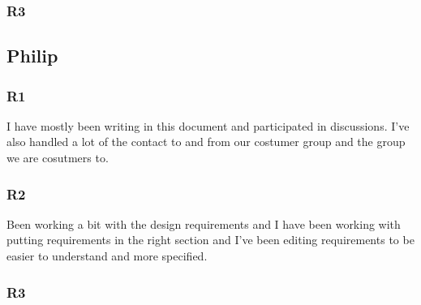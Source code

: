 \documentclass[a4paper]{article}
\begin{document}
    \subsubsection{R3}
  \subsection{Philip}
    \subsubsection{R1}
  I have mostly been writing in this document and participated in discussions. I've also handled a lot of the contact to and from our costumer group and the group we are cosutmers to.
    \subsubsection{R2}
    Been working a bit with the design requirements and I have been working with putting requirements in the right section and I've been editing requirements to be easier to understand and more specified. 
    \subsubsection{R3}
\end{document}
